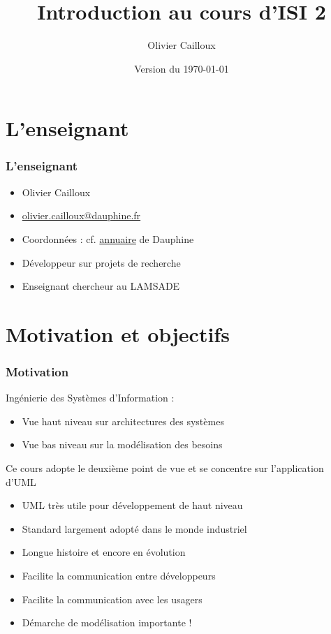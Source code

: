\documentclass[french]{beamer}
\title{Introduction au cours d’ISI 2}
\author{Olivier Cailloux}
\institute[LAMSADE]{LAMSADE, Université Paris-Dauphine}
\date{Version du \today}
\begin{document}
\begin{frame}[plain]
	\titlepage
\end{frame}
\addtocounter{framenumber}{-1}

\section{L’enseignant}
\begin{frame}
	\frametitle{L’enseignant}
	\begin{itemize}
		\item Olivier Cailloux
		\item \href{mailto:olivier.cailloux@dauphine.fr}{olivier.cailloux@dauphine.fr}
		\item Coordonnées : cf. \href{https://annuaire.dauphine.psl.eu/annuaire/index.php?param0=fiche&param1=ocailloux}{annuaire} de Dauphine 
		\item Développeur sur projets de recherche
		\item Enseignant chercheur au LAMSADE
	\end{itemize}
\end{frame}

\section{Motivation et objectifs}
\begin{frame}
	\frametitle{Motivation}
	Ingénierie des Systèmes d’Information : 
	\begin{itemize}
		\item Vue haut niveau sur architectures des systèmes 
		\item Vue bas niveau sur la modélisation des besoins
	\end{itemize}
	Ce cours adopte le deuxième point de vue et se concentre sur l’application d’UML
	\begin{itemize}
		\item UML très utile pour développement de haut niveau
		\item Standard largement adopté dans le monde industriel
		\item Longue histoire et encore en évolution
		\item Facilite la communication entre développeurs
		\item Facilite la communication avec les usagers
		\item Démarche de modélisation importante !
	\end{itemize}
\end{frame}
\end{document}

